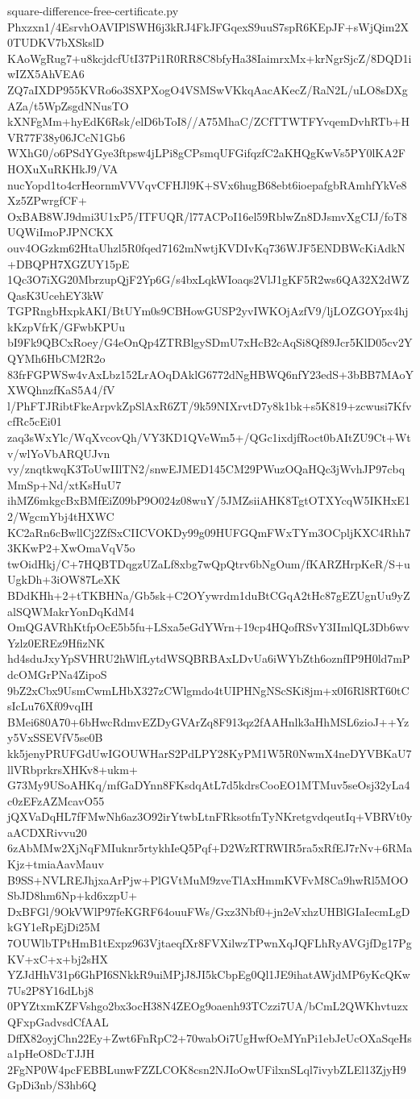 \documentclass[11pt]{article}
\theoremstyle{definition}
\theoremstyle{remark}
\begin{document}
\begin{filecontents*}[overwrite]{square-difference-free-certificate.py}
Phxzxn1/4EsrvhOAVIPlSWH6j3kRJ4FkJFGqexS9uuS7spR6KEpJF+sWjQim2X0TUDKV7bXSkslD
KAoWgRug7+u8kcjdcfUtI37Pi1R0RR8C8bfyHa38IaimrxMx+krNgrSjcZ/8DQD1iwIZX5AhVEA6
ZQ7aIXDP955KVRo6o3SXPXogO4VSMSwVKkqAacAKecZ/RaN2L/uLO8sDXgAZa/t5WpZsgdNNusTO
kXNFgMm+hyEdK6Rsk/elD6bToI8//A75MhaC/ZCfTTWTFYvqemDvhRTb+HVR77F38y06JCcN1Gb6
WXhG0/o6PSdYGye3ftpsw4jLPi8gCPsmqUFGifqzfC2aKHQgKwVs5PY0lKA2FHOXuXuRKHkJ9/VA
nucYopd1to4crHeornmVVVqvCFHJl9K+SVx6hugB68ebt6ioepafgbRAmhfYkVe8Xz5ZPwrgfCF+
OxBAB8WJ9dmi3U1xP5/ITFUQR/l77ACPoI16el59RblwZn8DJsmvXgCIJ/foT8UQWiImoPJPNCKX
ouv4OGzkm62HtaUhzl5R0fqed7162mNwtjKVDIvKq736WJF5ENDBWcKiAdkN+DBQPH7XGZUY15pE
1Qc3O7iXG20MbrzupQjF2Yp6G/s4bxLqkWIoaqs2VlJ1gKF5R2ws6QA32X2dWZQasK3UcehEY3kW
TGPRngbHxpkAKI/BtUYm0s9CBHowGUSP2yvIWKOjAzfV9/ljLOZGOYpx4hjkKzpVfrK/GFwbKPUu
bI9Fk9QBCxRoey/G4eOnQp4ZTRBlgySDmU7xHcB2cAqSi8Qf89Jcr5KlD05cv2YQYMh6HbCM2R2o
83frFGPWSw4vAxLbz152LrAOqDAklG6772dNgHBWQ6nfY23edS+3bBB7MAoYXWQhnzfKaS5A4/fV
l/PhFTJRibtFkeArpvkZpSlAxR6ZT/9k59NIXrvtD7y8k1bk+s5K819+zcwusi7KfvcfRc5cEi01
zaq3sWxYlc/WqXvcovQh/VY3KD1QVeWm5+/QGc1ixdjfRoct0bAItZU9Ct+Wtv/wlYoVbARQUJvn
vy/znqtkwqK3ToUwIIlTN2/snwEJMED145CM29PWuzOQaHQc3jWvhJP97cbqMmSp+Nd/xtKsHuU7
ihMZ6mkgcBxBMfEiZ09bP9O024z08wuY/5JMZsiiAHK8TgtOTXYcqW5IKHxE12/WgcmYbj4tHXWC
KC2aRn6cBwllCj2ZfSxCIICVOKDy99g09HUFGQmFWxTYm3OCpljKXC4Rhh73KKwP2+XwOmaVqV5o
twOidHkj/C+7HQBTDqgzUZaLf8xbg7wQpQtrv6bNgOum/fKARZHrpKeR/S+uUgkDh+3iOW87LeXK
BDdKHh+2+tTKBHNa/Gb5sk+C2OYywrdm1duBtCGqA2tHc87gEZUgnUu9yZalSQWMakrYonDqKdM4
OmQGAVRhKtfpOcE5b5fu+LSxa5eGdYWrn+19cp4HQofRSvY3IImlQL3Db6wvYzlz0EREz9HfizNK
hd4sduJxyYpSVHRU2hWlfLytdWSQBRBAxLDvUa6iWYbZth6oznfIP9H0ld7mPdcOMGrPNa4ZipoS
9bZ2xCbx9UsmCwmLHbX327zCWlgmdo4tUIPHNgNScSKi8jm+x0I6Rl8RT60tCsIcLu76Xf09vqIH
BMei680A70+6bHwcRdmvEZDyGVArZq8F913qz2fAAHnlk3aHhMSL6zioJ++Yzy5VxSSEVfV5se0B
kk5jenyPRUFGdUwIGOUWHarS2PdLPY28KyPM1W5R0NwmX4neDYVBKaU7llVRbprkrsXHKv8+ukm+
G73My9USoAHKq/mfGaDYnn8FKsdqAtL7d5kdrsCooEO1MTMuv5seOsj32yLa4c0zEFzAZMcavO55
jQXVaDqHL7fFMwNh6az3O92irYtwbLtnFRksotfnTyNKretgvdqeutIq+VBRVt0yaACDXRivvu20
6zAbMMw2XjNqFMIuknr5rtykhIeQ5Pqf+D2WzRTRWIR5ra5xRfEJ7rNv+6RMaKjz+tmiaAavMauv
B9SS+NVLREJhjxaArPjw+PlGVtMuM9zveTlAxHmmKVFvM8Ca9hwRl5MOOSbJD8hm6Np+kd6xzpU+
DxBFGl/9OkVWlP97feKGRF64ouuFWs/Gxz3Nbf0+jn2eVxhzUHBlGIaIecmLgDkGY1eRpEjDi25M
7OUWlbTPtHmB1tExpz963VjtaeqfXr8FVXilwzTPwnXqJQFLhRyAVGjfDg17PgKV+xC+x+bj2sHX
YZJdHhV31p6GhPI6SNkkR9uiMPjJ8JI5kCbpEg0Ql1JE9ihatAWjdMP6yKcQKw7Us2P8Y16dLbj8
0PYZtxmKZFVshgo2bx3ocH38N4ZEOg9oaenh93TCzzi7UA/bCmL2QWKhvtuzxQFxpGadvsdCfAAL
DffX82oyjChn22Ey+Zwt6FnRpC2+70wabOi7UgHwfOeMYnPi1ebJeUcOXaSqeHsa1pHeO8DcTJJH
2FgNP0W4pcFEBBLunwFZZLCOK8csn2NJIoOwUFilxnSLql7ivybZLEl13ZjyH9GpDi3nb/S3hb6Q

\end{filecontents*}
\end{document}

